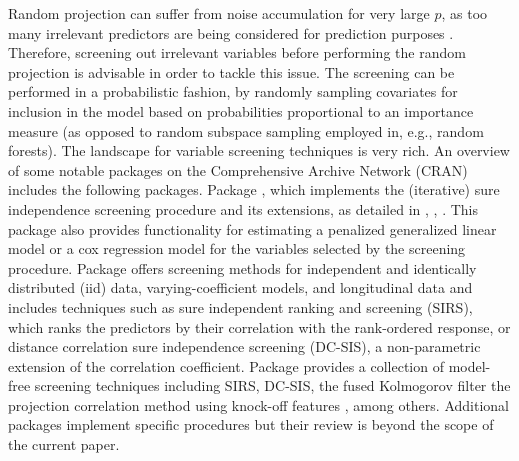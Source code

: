 \documentclass[
  article]{jss}
\begin{document}
Random projection can suffer from noise accumulation for very large
\(p\), as too many irrelevant predictors are being considered for
prediction purposes \citep{Dunson2020TargRandProj}. Therefore, screening
out irrelevant variables before performing the random projection is
advisable in order to tackle this issue. The screening can be performed
in a probabilistic fashion, by randomly sampling covariates for
inclusion in the model based on probabilities proportional to an
importance measure (as opposed to random subspace sampling employed in,
e.g., random forests). The  landscape for variable screening
techniques is very rich. An overview of some notable packages on the
Comprehensive  Archive Network (CRAN) includes the following
packages. Package  \citep{SISR}, which implements the
(iterative) sure independence screening procedure and its extensions, as
detailed in \citet{Fan2007SISforUHD}, \citet{Fan2010sisglms},
\citet{fan2010high}. This package also provides functionality for
estimating a penalized generalized linear model or a cox regression
model for the variables selected by the screening procedure. Package
 \citep{pkg:VariableScreening} offers screening
methods for independent and identically distributed (iid) data,
varying-coefficient models, and longitudinal data and includes
techniques such as sure independent ranking and screening (SIRS), which
ranks the predictors by their correlation with the rank-ordered
response, or distance correlation sure independence screening (DC-SIS),
a non-parametric extension of the correlation coefficient. Package
 \citep{pkg:MFSIS} provides a collection of model-free
screening techniques including SIRS, DC-SIS, the fused Kolmogorov filter
\citep{mai2015fusedkolmogorov} the projection correlation method using
knock-off features \citep{liu2020knockoff}, among others. Additional
packages implement specific procedures but their review is beyond the
scope of the current paper.
\end{document}
